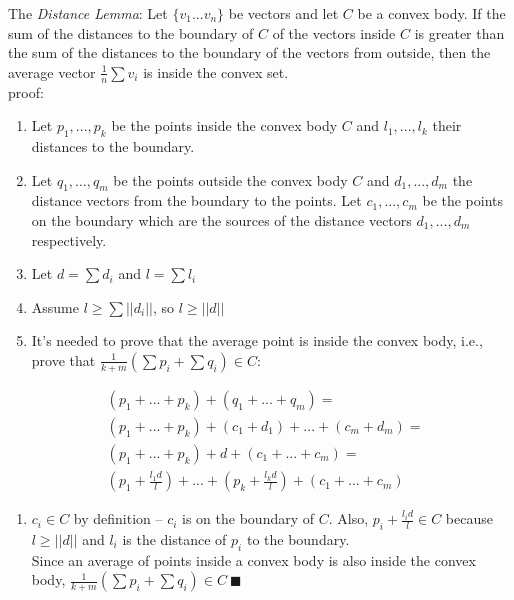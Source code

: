 \documentclass[10pt, conference]{IEEEtran}
\newcommand{\distanceLemma}{\textit{Distance Lemma}}
\begin{document}
The \distanceLemma : Let ${\{v_1 ... v_n\}}$ be vectors and let $C$ be a convex body. If the sum of the distances to the boundary of $C$ of the vectors inside $C$ is greater than the sum of the distances to the boundary of the vectors from outside, then the average vector ${\frac{1}{n}\sum {v_i}}$ is inside the convex set. \\
proof: \\
\begin{enumerate}
\item Let ${p_1 ,..., p_k}$ be the points inside the convex body $C$ and ${l_1 ,..., l_k}$ their distances to the boundary.
\item Let ${q_1 ,..., q_m}$ be the points outside the convex body $C$ and ${d_1 ,..., d_m}$ the distance vectors from the boundary to the points. Let ${c_1 ,..., c_m}$ be the points on the boundary which are the sources of the distance vectors ${d_1 ,..., d_m}$ respectively.
\item Let ${d = \sum {d_i}}$ and ${l = \sum {l_i}}$
\item Assume $l \geq \sum ||d_i||$, so $l \geq ||d||$
\item It's needed to prove that the average point is inside the convex body, i.e., prove that ${\frac{1}{k+m}(\sum{p_i} + \sum{q_i}) \in C}$:
\end{enumerate}
\begin{equation}
\begin{aligned}
&( p_1+...+p_k) + (q_1+...+q_m) = \\
&( p_1+...+p_k) + (c_1+d_1) + ... + (c_m + d_m) = \\
&( p_1+...+p_k) + d + (c_1 + ... + c_m) = \\
&\left( p_1 + \frac{l_1 d}{l}\right) + ... + \left(p_k + \frac{l_k d}{l}\right) + (c_1 + ... + c_m)
\end{aligned}
\end{equation}
\begin{enumerate}
\item[\ \ \ ] ${c_i \in C}$ by definition -- $c_i$ is on the boundary of $C$. Also, ${p_i + \frac{l_i d}{l} \in C}$ because ${l \geq ||d||}$ and $l_i$ is the distance of $p_i$ to the boundary. \\
Since an average of points inside a convex body is also inside the convex body, ${\frac{1}{k+m}(\sum{p_i} + \sum{q_i}) \in C \ \blacksquare} $ 
\end{enumerate}
\end{document}

